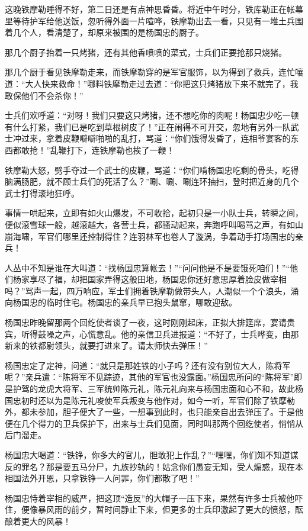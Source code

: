 \documentclass[12pt,oneside]{book}
\begin{document}
这晚铁摩勒睡得不好，第二日还是有点神思昏昏。将近中午时分，铁库勒正在帐幕里等待护军给他送饭，忽听得外面一片喧哗，铁摩勒出去一看，只见有一堆土兵围着几个人，看清楚了，却原来被围的是杨国忠的厨子。

那几个厨子抬着一只烤猪，还有其他香喷喷的菜式，士兵们正要抢那只烧猪。

那几个厨于看见铁摩勒走来，而铁摩勒穿的是军官服饰，以为得到了救兵，连忙嚷道：``大人快来救命！''哪料铁摩勒走过去道：``你把这只烤猪放下来不就完了，我敢保他们不会杀你！''

士兵们欢呼道：``对呀！我们只要这只烤猪，还不想吃你的肉呢！杨国忠少吃一顿有什么打紧，我们已是吃到草根树皮了！''正在闹得不可开交，忽地有另外一队武士冲过来，拿着皮鞭噼噼啪啪的乱打，骂道：``你们饿得发昏了，连相爷宴客的东西都敢抢！''乱鞭打下，连铁摩勒也挨了一鞭！

铁摩勒大怒，劈手夺过一个武士的皮鞭，骂道：``你们啃杨国忠吃剩的骨头，吃得脑满肠肥，就不顾士兵们的死活了么？''唰、唰、唰连环抽扫，登时把近身的几个武士打得滚地狂呼。

事情一哄起来，立即有如火山爆发，不可收拾，起初只是一小队士兵，转瞬之间，便似滚雪球一般，越滚越大，各营士兵，都骚动起来，奔跑呼叫喝骂之声，有如山崩海啸，军官们哪里还控制得住？连羽林军也卷人了漩涡，争着动手打场国忠的亲兵！

人丛中不知是谁在大叫道：``找杨国忠算帐去！''``问问他是不是要饿死咱们！''``他们杨家享尽了福，却把国家弄得这般田地，杨国忠你还好意思厚着脸皮做宰相吗？''骂声一起，四万响应，军士们拥着铁摩勒做带头人，人潮似一个个浪头，涌向杨国忠的临时住宅。杨国忠的亲兵早已抱头鼠窜，哪敢迎敌。

杨国忠昨晚留那两个回纥使者谈了一夜，这时刚刚起床，正拟大排筵席，宴请贵宾，听得鼓噪之声，心慌意乱。他的亲信卫兵进报道：``不好了，士兵哗变，由那新来的铁都尉领头，就要打进来了。请太师快去弹压！''

杨国忠定了定神，问道：``就只是那姓铁的小子吗？还有没有别位大人，陈将军呢？''亲兵遣：``陈将军不见踪迹，其他的军官也没露面。''杨国忠所问的``陈将军''即是护驾的龙虎大将军、三军统帅陈元礼，陈元礼向来与杨国忠面和心不和，故此杨国忠初时还以为是陈元礼唆使军兵叛变与他作对，如今一听，军官们除了铁摩勒外，都未参加，胆子便大了一些，一想事到此时，也只能亲自出去弹压了。于是他便在几个得力的卫兵保护下，出来与士兵们见面，同时叫那两个回纥使者，悄悄从后门溜走。

杨国忠大喝道：``铁铮，你多大的官儿，胆敢犯上作乱？''``嘿嘿，你们知不知道谋反的罪名？那是要五马分尸，九族抄轨的！姑念你们愚妄无知，受人煽惑，现在本相国法外开恩，只拿铁铮一人问罪，你们都散了吧！''

杨国忠恃着宰相的威严，把这顶``造反''的大帽子一压下来，果然有许多士兵被他吓住，便像暴风雨的前夕，暂时间静止下来，但更多的士兵印激起了更大的愤怒，酝酿着更大的风暴！
\end{document}
